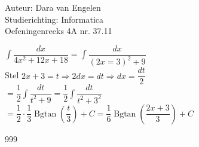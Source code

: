 \documentclass[a4paper]{article}
\begin{document}
  
\noindent \large Auteur: Dara van Engelen \\
\noindent \large Studierichting: Informatica\\
\noindent \large Oefeningenreeks 4A nr. 37.11\\

\medskip

\normalsize

$\displaystyle\int \dfrac{dx}{4x^2+12x+18} = \displaystyle\int \dfrac{dx}{(2x=3)^2 + 9} $\\

Stel $ 2x+3 = t \Rightarrow 2dx = dt \Rightarrow dx = \dfrac{dt}{2}$\\

$ = \dfrac{1}{2} \displaystyle\int \dfrac{dt}{t^2+9} = \dfrac{1}{2} \displaystyle\int \dfrac{dt}{t^2 + 3^2}$\\

$ = \dfrac{1}{2} \cdot \dfrac{1}{3} \operatorname{Bgtan}\left(\dfrac{t}{3}\right) + C = \dfrac{1}{6} \operatorname{Bgtan} \left( \dfrac{2x+3}{3}\right) + C$\\

\begin{thebibliography}{999}
\end{thebibliography}
\end{document}
